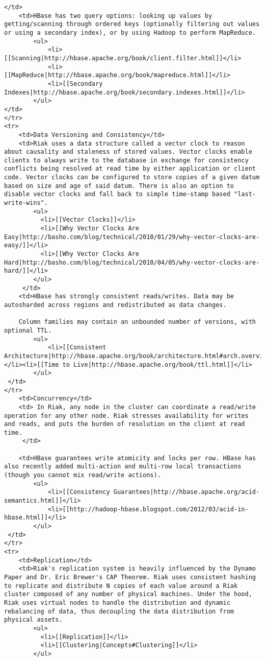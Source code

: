 \documentclass[letter]{book}
\newcounter{tab}[chapter]
\begin{document}
\begin{shaded}\begin{verbatim}
</td>
    <td>HBase has two query options: looking up values by getting/scanning through ordered keys (optionally filtering out values or using a secondary index), or by using Hadoop to perform MapReduce.
        <ul>
            <li>[[Scanning|http://hbase.apache.org/book/client.filter.html]]</li>
            <li>[[MapReduce|http://hbase.apache.org/book/mapreduce.html]]</li>
            <li>[[Secondary Indexes|http://hbase.apache.org/book/secondary.indexes.html]]</li>
        </ul>
</td>
</tr>
<tr>
    <td>Data Versioning and Consistency</td>
    <td>Riak uses a data structure called a vector clock to reason about causality and staleness of stored values. Vector clocks enable clients to always write to the database in exchange for consistency conflicts being resolved at read time by either application or client code. Vector clocks can be configured to store copies of a given datum based on size and age of said datum. There is also an option to disable vector clocks and fall back to simple time-stamp based "last-write-wins".
        <ul>
          <li>[[Vector Clocks]]</li>
          <li>[[Why Vector Clocks Are Easy|http://basho.com/blog/technical/2010/01/29/why-vector-clocks-are-easy/]]</li>
          <li>[[Why Vector Clocks Are Hard|http://basho.com/blog/technical/2010/04/05/why-vector-clocks-are-hard/]]</li>
        </ul>
     </td>
    <td>HBase has strongly consistent reads/writes. Data may be autosharded across regions and redistributed as data changes.

    Column families may contain an unbounded number of versions, with optional TTL.
        <ul>
            <li>[[Consistent Architecture|http://hbase.apache.org/book/architecture.html#arch.overview.nosql]]</li><li>[[Time to Live|http://hbase.apache.org/book/ttl.html]]</li>
        </ul>
 </td>
</tr>
    <td>Concurrency</td>
    <td> In Riak, any node in the cluster can coordinate a read/write operation for any other node. Riak stresses availability for writes and reads, and puts the burden of resolution on the client at read time.
     </td>

    <td>HBase guarantees write atomicity and locks per row. HBase has also recently added multi-action and multi-row local transactions (though you cannot mix read/write actions).
        <ul>
            <li>[[Consistency Guarantees|http://hbase.apache.org/acid-semantics.html]]</li>
            <li>[[http://hadoop-hbase.blogspot.com/2012/03/acid-in-hbase.html]]</li>
        </ul>
 </td>
</tr>
<tr>
    <td>Replication</td>
    <td>Riak's replication system is heavily influenced by the Dynamo Paper and Dr. Eric Brewer's CAP Theorem. Riak uses consistent hashing to replicate and distribute N copies of each value around a Riak cluster composed of any number of physical machines. Under the hood, Riak uses virtual nodes to handle the distribution and dynamic rebalancing of data, thus decoupling the data distribution from physical assets.
        <ul>
          <li>[[Replication]]</li>
          <li>[[Clustering|Concepts#Clustering]]</li>
        </ul>


\end{verbatim}
\end{shaded}
\end{document}
